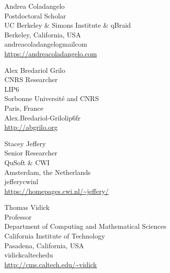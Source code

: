 \documentclass{toc}
\begin{document}
\begin{tocauthors}
\begin{tocinfo}[coladangelo]
 Andrea Coladangelo\\
 Postdoctoral Scholar\\
 UC Berkeley \& Simons Institute \& qBraid\\
 Berkeley, California, USA\\
 andrea\tocdot{}coladangelo\tocat{}gmail\tocdot{}com\\   \url{https://andreacoladangelo.com}      \end{tocinfo}
\begin{tocinfo}[grilo]
 Alex Bredariol Grilo\\
 CNRS Researcher\\
 LIP6\\
 Sorbonne Universit\'e and CNRS\\
 Paris, France\\
 Alex.Bredariol-Grilo\tocat{}lip6\tocdot{}fr \\   \url{http://abgrilo.org}      \end{tocinfo}
\begin{tocinfo}[jeffery]
 Stacey Jeffery\\
 Senior Researcher\\
 QuSoft \& CWI\\
 Amsterdam, the Netherlands\\
 jeffery\tocat{}cwi\tocdot{}nl \\   \url{https://homepages.cwi.nl/~jeffery/}      \end{tocinfo}
\begin{tocinfo}[vidick]
 Thomas Vidick\\
 Professor\\
 Department of Computing and Mathematical Sciences\\
 California Institute of Technology\\
 Pasadena, California, USA\\
 vidick\tocat{}caltech\tocdot{}edu \\   \url{http://cms.caltech.edu/~vidick}      \end{tocinfo}
\end{tocauthors}
\end{document}
